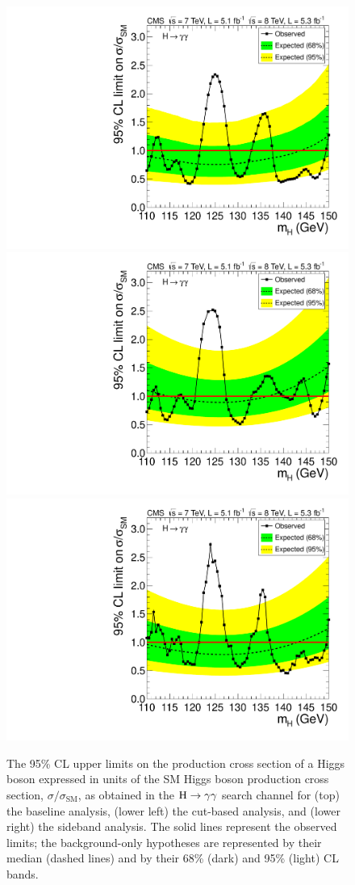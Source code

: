 \documentclass[12pt,twoside,a4paper,cmspaper,final,collab]{cms-tdr}
\begin{document}
\begin{figure}[htbp]
    \begin{center}
      \includegraphics[width=0.49\linewidth]{figures/hgg_MassFactLimit}  \\
     \includegraphics[width=0.49\linewidth]{figures/hgg_BaselineLimit}
      \includegraphics[width=0.49\linewidth]{figures/hgg_MassWindowLimit}
     \caption{The 95\% CL upper limits
on the production cross section of a Higgs boson
expressed in units of the SM Higgs boson production cross section,
$\sigma / \sigma_\text{SM}$,
     as obtained in the $\mathrm{H} \to \gamma\gamma$ search channel for
     (top) the baseline analysis,
     (lower left) the cut-based analysis, and
     (lower right) the sideband analysis.
     The solid lines represent the observed limits;
     the background-only hypotheses are represented by their median (dashed
     lines) and by their 68\% (dark) and 95\% (light) CL bands.
       }
      \label{fig:LimitGaGa}
    \end{center}
\end{figure}
\end{document}
